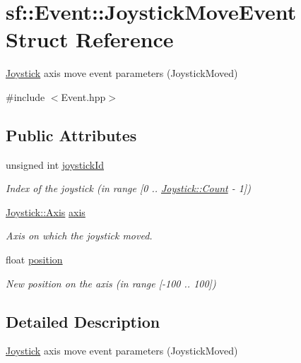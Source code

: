 \hypertarget{structsf_1_1_event_1_1_joystick_move_event}{\section{sf\-:\-:Event\-:\-:Joystick\-Move\-Event Struct Reference}
\label{structsf_1_1_event_1_1_joystick_move_event}
}


\hyperlink{classsf_1_1_joystick}{Joystick} axis move event parameters (Joystick\-Moved)  




{\ttfamily \#include $<$Event.\-hpp$>$}

\subsection*{Public Attributes}
\begin{DoxyCompactItemize}
\item 
unsigned int \hyperlink{structsf_1_1_event_1_1_joystick_move_event_a7bf2b2f2941a21ed26a67c95f5e4232f}{joystick\-Id}
\begin{DoxyCompactList}\small\item\em Index of the joystick (in range \mbox{[}0 .. \hyperlink{classsf_1_1_joystick_ac4ca4ee36e2cf04ecf931316e4463ca6a6e0a2a95bc1da277610c04d80f52715e}{Joystick\-::\-Count} -\/ 1\mbox{]}) \end{DoxyCompactList}\item 
\hyperlink{classsf_1_1_joystick_a48db337092c2e263774f94de6d50baa7}{Joystick\-::\-Axis} \hyperlink{structsf_1_1_event_1_1_joystick_move_event_add22e8126b7974271991dc6380cbdee3}{axis}
\begin{DoxyCompactList}\small\item\em Axis on which the joystick moved. \end{DoxyCompactList}\item 
float \hyperlink{structsf_1_1_event_1_1_joystick_move_event_aba5a70815420161375fd2e756689c32a}{position}
\begin{DoxyCompactList}\small\item\em New position on the axis (in range \mbox{[}-\/100 .. 100\mbox{]}) \end{DoxyCompactList}\end{DoxyCompactItemize}


\subsection{Detailed Description}
\hyperlink{classsf_1_1_joystick}{Joystick} axis move event parameters (Joystick\-Moved) 

